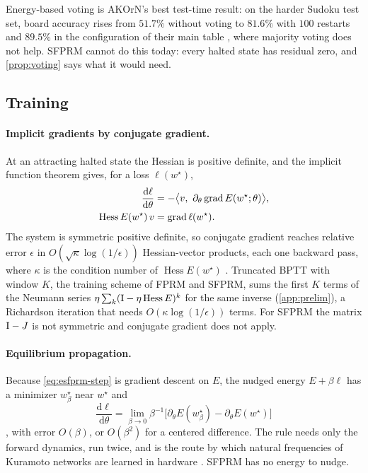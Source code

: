Energy-based voting is AKOrN's best test-time result: on the harder Sudoku test set, board accuracy
rises from $51.7\%$ without voting to $81.6\%$ with $100$ restarts and $89.5\%$ in the configuration
of their main table \citep{miyato2025akorn}, where majority voting does not help. SFPRM cannot do
this today: every halted state has residual zero, and \cref{prop:voting} says what it would need.

\subsection{Training}
\label{sec:energy-training}

\paragraph{Implicit gradients by conjugate gradient.}
At an attracting halted state the Hessian is positive definite, and the implicit function theorem
gives, for a loss $\ell(w^\star)$,
\begin{equation}
\begin{aligned}
  \frac{\mathrm d\ell}{\mathrm d\theta}&=-\big\langle v,\ \partial_\theta\grad E(w^\star;\theta)\big\rangle,\\
  \operatorname{Hess}E(w^\star)\,v&=\grad\ell(w^\star).
\end{aligned}
  \label{eq:implicit}
\end{equation}
The system is symmetric positive definite, so conjugate gradient \citep{hestenes1952cg} reaches
relative error $\epsilon$ in $O(\sqrt\kappa\log(1/\epsilon))$ Hessian-vector products, each one
backward pass, where $\kappa$ is the condition number of $\operatorname{Hess}E(w^\star)$
\citep{nocedal2006}. Truncated BPTT with window $K$, the training scheme of FPRM and SFPRM, sums the
first $K$ terms of the Neumann series $\eta\sum_k(\mathrm{I}-\eta\operatorname{Hess}E)^k$ for the same
inverse (\cref{app:prelim}), a Richardson iteration that needs $O(\kappa\log(1/\epsilon))$ terms. For
SFPRM the matrix $\mathrm{I}-J$ is not symmetric and conjugate gradient does not apply.

\paragraph{Equilibrium propagation.}
Because \eqref{eq:esfprm-step} is gradient descent on $E$, the nudged energy $E+\beta\ell$ has a
minimizer $w^\star_\beta$ near $w^\star$ and
\begin{equation}
  \frac{\mathrm d\ell}{\mathrm d\theta}=\lim_{\beta\to0}\beta^{-1}\big[\partial_\theta E(w^\star_\beta)-\partial_\theta E(w^\star)\big]
  \label{eq:ep}
\end{equation}
\citep{scellier2017ep}, with error $O(\beta)$, or $O(\beta^2)$ for a centered difference. The rule
needs only the forward dynamics, run twice, and is the route by which natural frequencies of
Kuramoto networks are learned in hardware \citep{ahmadi2026phase}. SFPRM has no energy to nudge.

